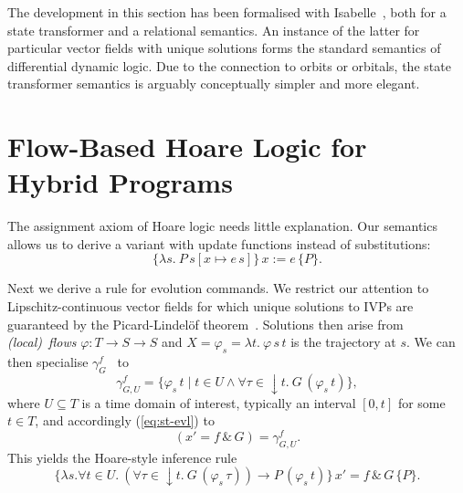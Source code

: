 \documentclass[envcountsames]{llncs}
\newcommand{\flow}{\varphi}
\newcommand\notein[3]{\todo[inline,linecolor=orange!80!black,backgroundcolor=#2!20]{#1: #3}%
}
\newcommand{\gin}[1]{\notein{{\bf GS}}{gcolor}{#1}}
\begin{document}
The development in this section has been formalised with
Isabelle~\cite{afp:hybrid}, both for a state transformer and a
relational semantics. An instance of the latter for particular vector
fields with unique solutions forms the standard semantics of
differential dynamic logic. Due to the connection to orbits or
orbitals, the state transformer semantics is arguably conceptually
simpler and more elegant.




\section{Flow-Based Hoare Logic for Hybrid
  Programs}\label{sec:hoare-flow}

The assignment axiom of Hoare logic needs little explanation. Our
semantics allows us to derive a variant with update functions instead
of substitutions:
\begin{equation}
\{\lambda s.\ P\, s[x\mapsto e\, s]\}\,  x:=e\, \{P\}. \label{eq:h-assgn}\tag{h-assgn}
\end{equation}

Next we derive a rule for evolution commands.  We restrict our
attention to Lipschitz-continuous vector fields for which unique
solutions to IVPs are guaranteed by the Picard-Lindel\"of
theorem~\cite{Hirsch09,Teschl12}.  Solutions then arise from
\emph{(local)\ flows} $\flow:T\to S\to S$ and
$X=\flow_s=\lambda t.\ \flow\, s\, t$ is the trajectory at $s$. We can
then specialise $\gamma^f_G$~\cite{MuniveS19} to
\begin{equation*}
  \gamma^f_{G,U} = \{\flow_s\, t\mid t\in U\land \forall\tau \in
  {\downarrow}t.\ G\, (\flow_s\, t)\},
\end{equation*}
where $U\subseteq T$ is a time domain of interest, typically an interval
$[0,t]$ for some $t\in T$, and accordingly (\ref{eq:st-evl}) to
\begin{equation}
  (x' = f\, \&\, G)= \gamma^f_{G,U}.\label{eq:st-evl-flow}\tag{st-evl-flow}
\end{equation}
This yields the Hoare-style inference rule
\begin{equation}
\{\lambda s.\forall t\in U.\ (\forall
\tau\in {\downarrow}t.\ G\, (\flow_s\, \tau)) \rightarrow P\,
(\flow_s\, t)\}\, x' = f\, \&\, G\, \{P\}. \label{eq:h-evl}\tag{h-evl}
\end{equation}

\gin{is this correct?}
\end{document}
